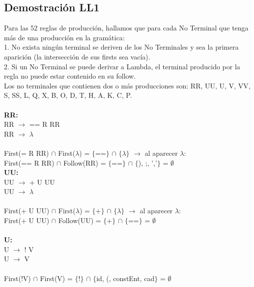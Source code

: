 \documentclass{article}[a4paper]
\newcommand\tab[1][1cm]{\hspace*{#1}}
\begin{document}
\subsection{Demostración LL1}
Para las 52 reglas de producción, hallamos que para cada No Terminal que tenga más de una producción en la gramática:\\
1. No exista ningún terminal se deriven de los No Terminales y sea la primera aparición (la intersección de sus firsts sea vacía).\\
2. Si un No Terminal se puede derivar a Lambda, el terminal producido por la regla no puede estar contenido en su follow.\\

Los no terminales que contienen dos o más producciones son: RR, UU, U, V, VV, S, SS, L, Q, X, B, O, D, T, H, A, K, C, P.\\ \\

\textbf{RR:}\\
\tab RR $\rightarrow$ == R RR\\ 
\tab RR $\rightarrow$ $\lambda$\\ \\
\tab \tab First(= R RR) $\cap$ First($\lambda$) = $\lbrace$==$\rbrace$ $\cap$ $\lbrace$$\lambda$$\rbrace$ $\rightarrow$ al aparecer $\lambda$:\\
\tab \tab First(== R RR) $\cap$ Follow(RR) = $\lbrace$==$\rbrace$ $\cap$ $\lbrace$), ;, ','$\rbrace$ = $\emptyset$\\

\textbf{UU:}\\
\tab UU $\rightarrow$ + U UU\\ 
\tab UU $\rightarrow$ $\lambda$\\ \\
\tab \tab First(+ U UU) $\cap$ First($\lambda$) = $\lbrace$+$\rbrace$ $\cap$ $\lbrace$$\lambda$$\rbrace$ $\rightarrow$ al aparecer $\lambda$:\\
\tab \tab First(+ U UU) $\cap$ Follow(UU) = $\lbrace$+$\rbrace$ $\cap$ $\lbrace$==$\rbrace$ = $\emptyset$\\ \\

\textbf{U:}\\
\tab U $\rightarrow$ ! V\\
\tab U $\rightarrow$ V\\ \\
\tab \tab First(!V) $\cap$ First(V) = $\lbrace$!$\rbrace$ $\cap$ $\lbrace$id, (, constEnt, cad$\rbrace$ = $\emptyset$\\
\end{document}
